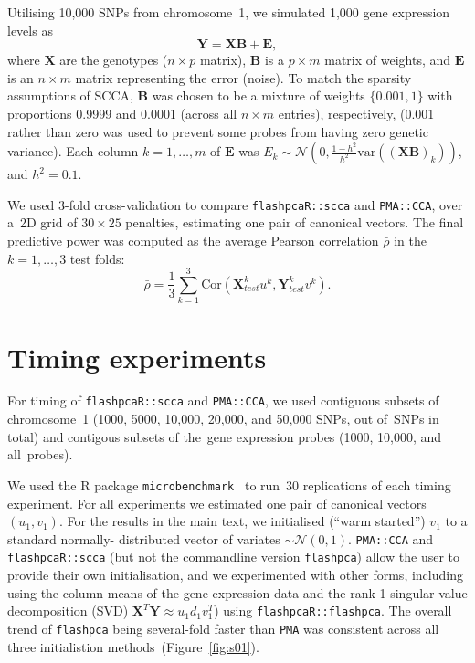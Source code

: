 \documentclass[a4paper,12pt]{article}
\begin{document}
Utilising 10,000 SNPs from chromosome~1, we simulated 1,000 gene expression
levels as
$$
\mathbf{Y} = \mathbf{X} \mathbf{B} + \mathbf{E},
$$
where $\mathbf{X}$ are the genotypes ($n \times p$ matrix), $\mathbf{B}$
is a $p \times m$ matrix of weights, and $\mathbf{E}$ is an $n \times m$
matrix representing the error (noise). To match the sparsity assumptions of
SCCA, $\mathbf{B}$ was chosen to be a mixture of weights $\{0.001, 1\}$ with
proportions 0.9999 and 0.0001 (across all $n \times m$ entries), respectively,
(0.001 rather than zero was used to prevent some probes from having zero
genetic variance). Each column $k=1,\hdots,m$ of $\mathbf{E}$ was $E_k \sim
\mathcal{N}(0, \frac{1-h^2}{h^2} \mbox{var}((\mathbf{X}\mathbf{B})_k))$,
and $h^2=0.1$.

We used 3-fold cross-validation to compare \texttt{flashpcaR::scca} and
\texttt{PMA::CCA}, over a~2D grid of $30\times25$ penalties, estimating one
pair of canonical vectors. The final predictive power was computed as the
average Pearson correlation $\bar{\rho}$ in the~$k=1,\hdots,3$ test folds:
$$
\bar{\rho} = \frac{1}{3} \sum_{k=1}^3
   \mbox{Cor}(\mathbf{X}_{test}^k u^k, \mathbf{Y}_{test}^k v^k).
$$

\section{Timing experiments}

For timing of \texttt{flashpcaR::scca} and \texttt{PMA::CCA}, we used contiguous
subsets of chromosome~1 (1000, 5000, 10,000, 20,000, and 50,000 SNPs, out
of~\ngenes SNPs in total) and contigous subsets of the~\ngenes gene expression
probes (1000, 10,000, and all~\ngenes probes).

We used the \textsf{R} package \texttt{microbenchmark}~\citep{Mersmann2015}
to run~30 replications of each timing experiment.  For all experiments we
estimated one pair of canonical vectors $(u_1, v_1)$.  For the results in the
main text, we initialised (``warm started'') $v_1$ to a standard normally-
distributed vector of variates $\sim\mathcal{N}(0,1)$. \texttt{PMA::CCA} and
\texttt{flashpcaR::scca} (but not the commandline version \texttt{flashpca})
allow the user to provide their own initialisation, and we experimented with
other forms, including using the column means of the gene expression data
and the rank-1 singular value decomposition (SVD) $\mathbf{X}^T \mathbf{Y}
\approx u_1 d_1 v_1^T$) using \texttt{flashpcaR::flashpca}. The overall
trend of \texttt{flashpca} being several-fold faster than \texttt{PMA}
was consistent across all three initialistion methods~(Figure~\ref{fig:s01}).
\end{document}
